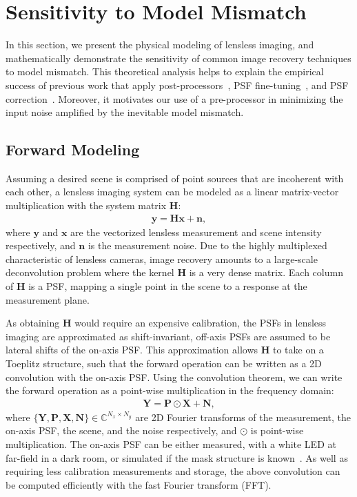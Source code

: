 \section{Sensitivity to Model Mismatch}

\noindent In this section, we present the physical modeling of lensless imaging, and mathematically demonstrate the sensitivity of common image recovery techniques to model mismatch.
This theoretical analysis helps to explain the empirical success of previous work that apply post-processors~\cite{Monakhova:19,9239993}, PSF fine-tuning~\cite{9239993}, and PSF correction~\cite{Li:23}.
Moreover, it motivates our use of a pre-processor in minimizing the input noise amplified by the inevitable model mismatch.

\subsection{Forward Modeling}

\noindent Assuming a desired scene is comprised of point sources that are incoherent with each other, a lensless imaging system
can be modeled as a linear matrix-vector multiplication with the system matrix $\bm{H}$:
\begin{align}
    \label{eq:forward_gen}
    \bm{y} = \bm{H}\bm{x} + \bm{n},
\end{align}
where $\bm{y}$ and $\bm{x}$ are the vectorized lensless measurement and scene intensity respectively, and $\bm{n}$ is the measurement noise.
Due to the highly multiplexed characteristic of lensless cameras, image recovery amounts to a large-scale deconvolution problem where the kernel $\bm{H}$ is a very dense matrix.
Each column of $\bm{H}$ is a PSF, mapping a single point in the scene to a response at the measurement plane.

As obtaining $\bm{H}$ would require an expensive calibration, the PSFs in lensless imaging are approximated as shift-invariant, \ie off-axis PSFs are assumed to be lateral shifts of the on-axis PSF.
This approximation allows $\bm{H}$ to take on a Toeplitz structure, such that the forward operation can be written as a 2D convolution with the on-axis PSF.
Using the convolution theorem, we can write the forward operation as a point-wise multiplication in the frequency domain:
\begin{align}
\label{eq:lsi_forward}
    \bm{Y} = \bm{P} \odot \bm{X} + \bm{N},
\end{align}
where $\{\bm{Y}, \bm{P}, \bm{X}, \bm{N}\} \in \mathbb{C}^{N_x \times N_y}$ are 2D Fourier transforms of the measurement, the on-axis PSF, the scene, and the noise respectively, and $\odot$ is point-wise multiplication.
The on-axis PSF can be either measured, \eg with a white LED at far-field in a dark room, or simulated if the mask structure is known~\cite{9239993,Li:23}.
As well as requiring less calibration measurements and storage, the above convolution can be computed efficiently with the fast Fourier transform (FFT).

